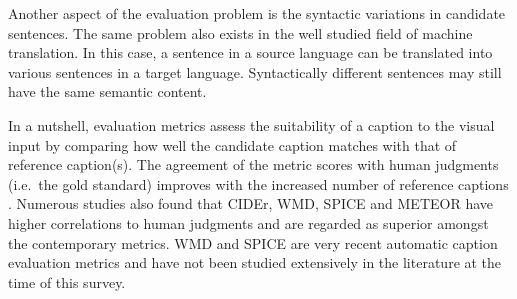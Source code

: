 \documentclass[10pt,journal,compsoc]{IEEEtran}
\begin{document}
Another aspect of the evaluation problem is the syntactic variations in candidate sentences. The same problem also exists in the well studied field of machine translation. In this case, a sentence in a source language can be translated into various sentences in a target language. Syntactically different sentences may still have the same semantic content.

In a nutshell, evaluation metrics assess the suitability of a caption to the visual input by comparing how well the candidate caption matches with that of reference caption(s). The agreement of the metric scores with human judgments (i.e.~the gold standard) improves with the increased number of reference captions \cite{vedantam2015cider}. %
Numerous studies \cite{vedantam2015cider, vedantam2015cider, pan2016hierarchical, yu2016video, venugopalan2015sequence} also found that CIDEr, WMD, SPICE and METEOR have higher correlations to human judgments and are regarded as superior amongst the contemporary metrics. WMD and SPICE are very recent automatic caption evaluation metrics and have not been studied extensively in the literature at the time of this survey.
\end{document}
